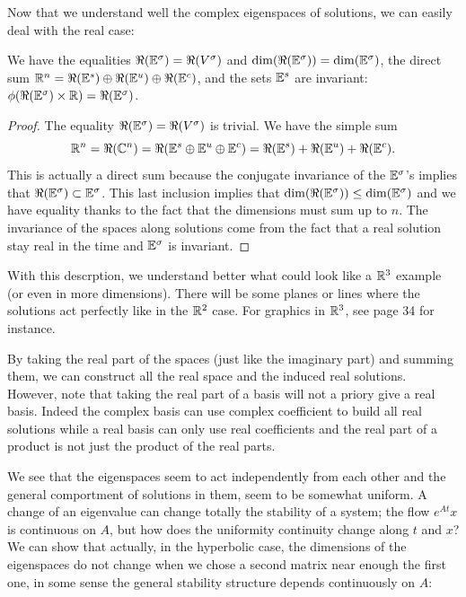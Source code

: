 Now that we understand well the complex eigenspaces of solutions, we can easily deal with the real case:
\begin{corollaire}
    We have the equalities $\Re(\mathbb{E}^\sigma)=\Re(V^\sigma)$ and $\dim(\Re(\mathbb{E}^\sigma))=\dim(\mathbb{E}^\sigma)$, the direct sum
    $\mathbb{R}^n = \Re(\mathbb{E}^s)\oplus\Re(\mathbb{E}^u)\oplus\Re(\mathbb{E}^c)$, and the sets $\mathbb{E}^s$ are invariant:
    $\phi(\Re(\mathbb{E}^\sigma)\times\mathbb{R})=\Re(\mathbb{E}^\sigma)$.
\end{corollaire}
\begin{proof}
The equality $\Re(\mathbb{E}^\sigma)=\Re(V^\sigma)$ is trivial. We have the simple sum
$$\mathbb{R}^n 
=\Re(\mathbb{C}^n) 
=\Re(\mathbb{E}^s\oplus\mathbb{E}^u\oplus\mathbb{E}^c)
= \Re(\mathbb{E}^s)+\Re(\mathbb{E}^u)+\Re(\mathbb{E}^c).$$
This is actually a direct sum because the conjugate invariance of the $\mathbb{E}^\sigma$'s implies that $\Re(\mathbb{E}^\sigma)\subset\mathbb{E}^\sigma$. This last inclusion implies that $\dim(\Re(\mathbb{E}^\sigma))\leq\dim(\mathbb{E}^\sigma)$ and we have equality thanks to the fact that the dimensions must sum up to $n$. The invariance of the spaces along solutions come from the fact that a real solution stay real in the time and $\mathbb{E}^\sigma$ is invariant.
\end{proof}
With this descrption, we understand better what could look like a $\mathbb{R}^3$ example (or even in more dimensions). There will be some planes or lines where the solutions act perfectly like in the $\mathbb{R}^2$ case. For graphics in $\mathbb{R}^3$, see \cite{Rob} page 34 for instance.
\begin{remarque}
By taking the real part of the spaces (just like the imaginary part) and summing them, we can construct all the real space and the induced real solutions. However, note that taking the real part of a basis will not a priory give a real basis. Indeed the complex basis can use complex coefficient to build all real solutions while a real basis can only use real coefficients and the real part of a product is not just the product of the real parts. 
\end{remarque}
We see that the eigenspaces seem to act independently from each other and the general comportment of solutions in them, seem to be somewhat uniform. A change of an eigenvalue can change totally the stability of a system; the flow $e^{At}x$ is continuous on $A$, but how does the uniformity continuity change along $t$ and $x$? We can show that actually, in the hyperbolic case, the dimensions of the eigenspaces do not change when we chose a second matrix near enough the first one, in some sense the general stability structure depends continuously on $A$:

